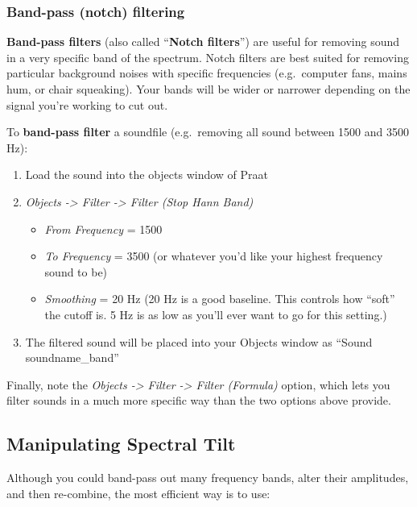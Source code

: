 \hypertarget{band-pass-notch-filtering}{%
\subsubsection{Band-pass (notch)
filtering}\label{band-pass-notch-filtering}}

\textbf{Band-pass filters} (also called ``\textbf{Notch filters}'') are
useful for removing sound in a very specific band of the spectrum. Notch
filters are best suited for removing particular background noises with
specific frequencies (e.g.~computer fans, mains hum, or chair
squeaking). Your bands will be wider or narrower depending on the signal
you're working to cut out.

To \textbf{band-pass filter} a soundfile (e.g.~removing all sound
between 1500 and 3500 Hz):

\begin{enumerate}
\def\labelenumi{\arabic{enumi}.}
\tightlist
\item
  Load the sound into the objects window of Praat
\item
  \emph{Objects -\textgreater{} Filter -\textgreater{} Filter (Stop Hann
  Band)}

  \begin{itemize}
  \tightlist
  \item
    \emph{From Frequency} = 1500
  \item
    \emph{To Frequency} = 3500 (or whatever you'd like your highest
    frequency sound to be)
  \item
    \emph{Smoothing} = 20 Hz (20 Hz is a good baseline. This controls
    how ``soft'' the cutoff is. 5 Hz is as low as you'll ever want to go
    for this setting.)
  \end{itemize}
\item
  The filtered sound will be placed into your Objects window as ``Sound
  soundname\_band''
\end{enumerate}

Finally, note the \emph{Objects -\textgreater{} Filter -\textgreater{}
Filter (Formula)} option, which lets you filter sounds in a much more
specific way than the two options above provide.

\hypertarget{manipulating-spectral-tilt}{%
\subsection{Manipulating Spectral
Tilt}\label{manipulating-spectral-tilt}}

Although you could band-pass out many frequency bands, alter their
amplitudes, and then re-combine, the most efficient way is to use:

